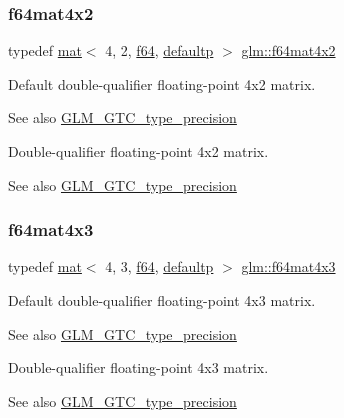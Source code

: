 \subsubsection{\texorpdfstring{f64mat4x2}{f64mat4x2}}
{\footnotesize\ttfamily typedef \hyperlink{structglm_1_1mat}{mat}$<$ 4, 2, \hyperlink{group__gtc__type__precision_ga2bba392e555124b36cde6abba349bab3}{f64}, \hyperlink{namespaceglm_a36ed105b07c7746804d7fdc7cc90ff25a9d21ccd8b5a009ec7eb7677befc3bf51}{defaultp} $>$ \hyperlink{group__gtc__type__precision_ga704001c2ed5838498ff61f55995fed3a}{glm\+::f64mat4x2}}

Default double-\/qualifier floating-\/point 4x2 matrix. \begin{DoxySeeAlso}{See also}
\hyperlink{group__gtc__type__precision}{G\+L\+M\+\_\+\+G\+T\+C\+\_\+type\+\_\+precision}
\end{DoxySeeAlso}
Double-\/qualifier floating-\/point 4x2 matrix. \begin{DoxySeeAlso}{See also}
\hyperlink{group__gtc__type__precision}{G\+L\+M\+\_\+\+G\+T\+C\+\_\+type\+\_\+precision} 
\end{DoxySeeAlso}
\mbox{\label{group__gtc__type__precision_gaf9b2bfbb2c79a39c693e2ab2bedf30e5}} 
\subsubsection{\texorpdfstring{f64mat4x3}{f64mat4x3}}
{\footnotesize\ttfamily typedef \hyperlink{structglm_1_1mat}{mat}$<$ 4, 3, \hyperlink{group__gtc__type__precision_ga2bba392e555124b36cde6abba349bab3}{f64}, \hyperlink{namespaceglm_a36ed105b07c7746804d7fdc7cc90ff25a9d21ccd8b5a009ec7eb7677befc3bf51}{defaultp} $>$ \hyperlink{group__gtc__type__precision_gaf9b2bfbb2c79a39c693e2ab2bedf30e5}{glm\+::f64mat4x3}}

Default double-\/qualifier floating-\/point 4x3 matrix. \begin{DoxySeeAlso}{See also}
\hyperlink{group__gtc__type__precision}{G\+L\+M\+\_\+\+G\+T\+C\+\_\+type\+\_\+precision}
\end{DoxySeeAlso}
Double-\/qualifier floating-\/point 4x3 matrix. \begin{DoxySeeAlso}{See also}
\hyperlink{group__gtc__type__precision}{G\+L\+M\+\_\+\+G\+T\+C\+\_\+type\+\_\+precision} 
\end{DoxySeeAlso}
\mbox{\label{group__gtc__type__precision_ga5fc21633b1546e4599609c47b4c8dac4}} 
